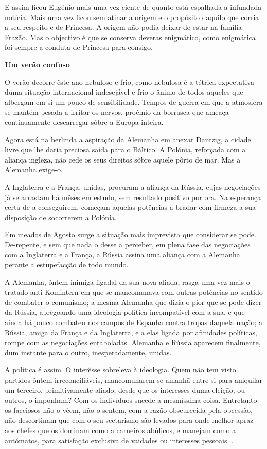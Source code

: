 \documentclass[9pt]{article}
\begin{document}
E assim ficou Eugé\-nio mais uma vez ciente de quanto está espa\-lhada a
infundada notícia. Mais uma vez ficou sem atinar a origem e o propósito
daquilo que corria a seu respeito e de Princesa. A origem não podia deixar
de estar na fa\-mí\-lia Frazão. Mas o objectivo é que se conserva deveras enigmático, como enigmática foi sempre a conduta de Princesa para consigo.

\begin{center}\bf\large Um verão confuso\end{center}

O verão decorre êste ano nebuloso e frio, como nebulosa é a tétrica
expectativa duma situa\-ção interna\-cio\-nal indesejável e frio o ânimo de todos aqueles que
albergam em si um pouco de sensibilidade. Tempos de guerra em que a atmosfera se mantém pesada a irritar os nervos, proémio da borrasca que ameaça
continuamente descarregar sôbre a Europa inteira.

Agora está na berlinda a aspira\-ção da Alemanha em anexar Dantzig, a
cidade livre que lhe daria preciosa saída para o Báltico. A Polónia, reforçada com a alian\-ça ingleza, não cede os seus direitos sôbre aquele pôrto
de mar. Mas a Alemanha exige-o.

A Inglaterra e a Fran\-ça, unidas, procuram a alian\-ça da Rússia, cujas
negocia\-ções já se arrastam há mêses em estudo, sem resultado positivo por
ora. Na esperan\-ça certa de a conseguirem, começam aquelas potências a bradar com firmeza a sua disposi\-ção de socorrerem a Polónia.

Em meados de Agosto surge a situa\-ção mais imprevista que considerar
se pode. De-repente, e sem que nada o desse a perceber, em plena fase das
negocia\-ções com a Inglaterra e a Fran\-ça, a Rússia assina uma alian\-ça com a
Alemanha perante a estupefac\-ção de todo mundo.

A Alemanha, ôntem inimiga figadal da sua nova aliada, rasga uma vez mais
o tratado anti-Komin\-tern em que se mancomunava com outras potências no sentido de combater o comunismo; a mesma Alemanha que dizia o pior que se
pode dizer da Rússia, aprègoando uma ideologia política incompatível com a
sua, e que ainda há pouco combateu nos campos de Espanha contra tropas daquela na\-ção; a Rússia, amiga da Fran\-ça e da Inglaterra, e a elas ligada por
afinidades políticas, rompe com as negocia\-ções entaboladas. Alemanha e Rússia aparecem finalmente, dum instante para o outro, inesperadamente, unidas.

A política é assim. O interêsse sobreleva à ideologia. Quem não tem
visto partidos ôntem irreconciliáveis, mancomunarem-se a\-ma\-nhã entre si para
aniquilar um terceiro, primitivamente aliado, desde que os interesses duma
elei\-ção, ou outros, o imponham? Com os indivíduos sucede a mesmíssima coisa.
Entretanto os facciosos não o vêem, não o sentem, com a razão obscurecida
pela obcessão, não descortinam que com o seu sectarismo são levados para
onde me\-lhor apraz  aos chefes que os dominam como a carneiros abúlicos, e manejam como a autómatos, para satisfa\-ção exclusiva de vaidades ou interesses
pessoais...
\end{document}
